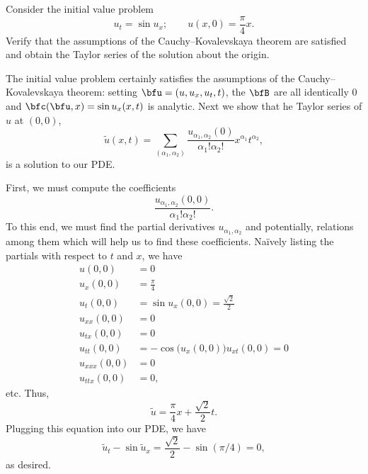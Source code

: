 \begin{problem}
  Consider the initial value problem
  \[
    u_t=\sin u_x;\qquad u(x,0)=\frac{\pi}{4}x.
  \]
  Verify that the assumptions of the Cauchy--Kovalevskaya theorem are
  satisfied and obtain the Taylor series of the solution about the origin.
\end{problem}
\begin{solution}
  The initial value problem certainly satisfies the assumptions of the
  Cauchy--Kovalevskaya theorem: setting \(\bfu=(u,u_x,u_t,t)\), the
  \(\bfB\) are all identically \(0\) and \(\bfc(\bfu,x)=\sin u_x(x,t)\) is
  analytic. Next we show that he Taylor series of \(u\) at \((0,0)\),
  \[
    \tilde u(x,t)=\sum_{(\alpha_1,\alpha_2)}
    \frac{u_{\alpha_1,\alpha_2}(0)}{\alpha_1!\alpha_2!} x^{\alpha_1}t^{\alpha_2},
  \]
  is a solution to our PDE.

  First, we must compute the coefficients
  \[
    \frac{u_{\alpha_1,\alpha_2}(0,0)}{\alpha_1!\alpha_2!}.
  \]
  To this end, we must find the partial derivatives
  \(u_{\alpha_1,\alpha_2}\) and potentially, relations among them which
  will help us to find these coefficients. Naïvely listing the partials
  with respect to \(t\) and \(x\), we have
  \begin{align*}
    u(0,0)&=0\\
    u_x(0,0)&=\frac{\pi}{4}\\
    u_t(0,0)&=\sin u_x(0,0)=\frac{\sqrt{2}}{2}\\
    u_{xx}(0,0)&=0\\
    u_{tx}(0,0)&=0\\
    u_{tt}(0,0)&=-\cos\bigl(u_x(0,0)\bigr)u_{xt}(0,0)=0\\
    u_{xxx}(0,0)&=0\\
    u_{ttx}(0,0)&=0,
  \end{align*}
  etc. Thus,
  \[
    \tilde u=\frac{\pi}{4}x+\frac{\sqrt{2}}{2}t.
  \]
  Plugging this equation into our PDE, we have
  \[
    \tilde u_t-\sin\tilde u_x=\frac{\sqrt{2}}{2}-\sin(\pi/4)=0,
  \]
  as desired.
\end{solution}
\newpage

